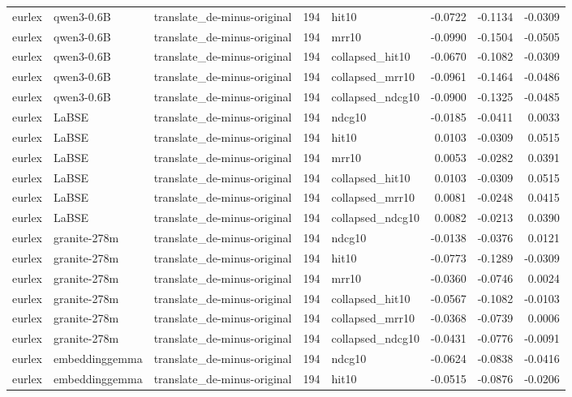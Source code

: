 \begin{tabular}{lllrlrrr}
eurlex & qwen3-0.6B & translate\_de-minus-original & 194 & hit10 & -0.0722 & -0.1134 & -0.0309 \\
eurlex & qwen3-0.6B & translate\_de-minus-original & 194 & mrr10 & -0.0990 & -0.1504 & -0.0505 \\
eurlex & qwen3-0.6B & translate\_de-minus-original & 194 & collapsed\_hit10 & -0.0670 & -0.1082 & -0.0309 \\
eurlex & qwen3-0.6B & translate\_de-minus-original & 194 & collapsed\_mrr10 & -0.0961 & -0.1464 & -0.0486 \\
eurlex & qwen3-0.6B & translate\_de-minus-original & 194 & collapsed\_ndcg10 & -0.0900 & -0.1325 & -0.0485 \\
eurlex & LaBSE & translate\_de-minus-original & 194 & ndcg10 & -0.0185 & -0.0411 & 0.0033 \\
eurlex & LaBSE & translate\_de-minus-original & 194 & hit10 & 0.0103 & -0.0309 & 0.0515 \\
eurlex & LaBSE & translate\_de-minus-original & 194 & mrr10 & 0.0053 & -0.0282 & 0.0391 \\
eurlex & LaBSE & translate\_de-minus-original & 194 & collapsed\_hit10 & 0.0103 & -0.0309 & 0.0515 \\
eurlex & LaBSE & translate\_de-minus-original & 194 & collapsed\_mrr10 & 0.0081 & -0.0248 & 0.0415 \\
eurlex & LaBSE & translate\_de-minus-original & 194 & collapsed\_ndcg10 & 0.0082 & -0.0213 & 0.0390 \\
eurlex & granite-278m & translate\_de-minus-original & 194 & ndcg10 & -0.0138 & -0.0376 & 0.0121 \\
eurlex & granite-278m & translate\_de-minus-original & 194 & hit10 & -0.0773 & -0.1289 & -0.0309 \\
eurlex & granite-278m & translate\_de-minus-original & 194 & mrr10 & -0.0360 & -0.0746 & 0.0024 \\
eurlex & granite-278m & translate\_de-minus-original & 194 & collapsed\_hit10 & -0.0567 & -0.1082 & -0.0103 \\
eurlex & granite-278m & translate\_de-minus-original & 194 & collapsed\_mrr10 & -0.0368 & -0.0739 & 0.0006 \\
eurlex & granite-278m & translate\_de-minus-original & 194 & collapsed\_ndcg10 & -0.0431 & -0.0776 & -0.0091 \\
eurlex & embeddinggemma & translate\_de-minus-original & 194 & ndcg10 & -0.0624 & -0.0838 & -0.0416 \\
eurlex & embeddinggemma & translate\_de-minus-original & 194 & hit10 & -0.0515 & -0.0876 & -0.0206 \\

\end{tabular}
